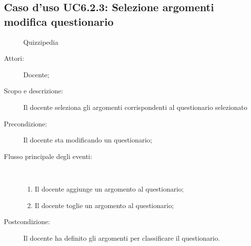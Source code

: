 \subsection{Caso d'uso UC6.2.3: Selezione argomenti modifica questionario}
	\begin{figure}[H]
		\centering
		\begin{resizedtikzpicture}{\textwidth}
		\begin{umlsystem}[x=0, fill=lightgray!20]{Quizzipedia}
		\end{umlsystem}
		\end{resizedtikzpicture}
		\caption{}
	\end{figure}
\begin{description}
\item[Attori:] Docente;
\item[Scopo e descrizione:] Il docente seleziona gli argomenti corrispondenti al questionario selezionato
      \item[Precondizione:] Il docente sta modificando un questionario;

        \item[Flusso principale degli eventi:] \ 
 \begin{enumerate}
          \item Il docente aggiunge un argomento al questionario;
          \item Il docente toglie un argomento al questionario;

      \end{enumerate}
    \item[Postcondizione:] Il docente ha definito gli argomenti per classificare il questionario.
  \end{description}
\hypertarget{UC6.3}{}
